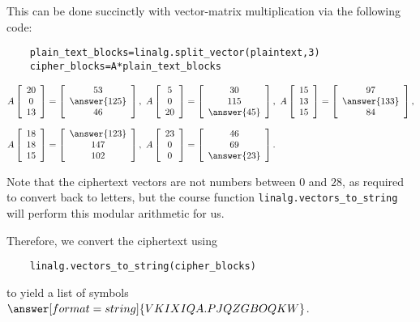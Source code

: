 \documentclass{ximera}
\begin{document}
\begin{example}
\begin{solution}
  This can be done succinctly with vector-matrix multiplication via the following code:

  \begin{verbatim}
    plain_text_blocks=linalg.split_vector(plaintext,3)
    cipher_blocks=A*plain_text_blocks
  \end{verbatim}


  \begin{align*}
    &A \startmat{c} 20 \\ 0 \\ 13 \stopmat
    = \startmat{c} 53\\\answer{125}\\46 \stopmat,
    \quad
    A \startmat{c} 5 \\ 0 \\ 20 \stopmat
    = \startmat{c} 30\\115\\\answer{45} \stopmat,
    \quad
    A \startmat{c} 15 \\ 13 \\ 15 \stopmat
    = \startmat{c} 97\\\answer{133}\\84 \stopmat,
    \\\\[-2ex]
    &A \startmat{c} 18 \\ 18 \\ 15 \stopmat
    = \startmat{c} \answer{123}\\147\\102 \stopmat,
    \quad
    A \startmat{c} 23 \\ 0 \\ 0 \stopmat
    = \startmat{c} 46\\69\\\answer{23} \stopmat.
  \end{align*}

  Note that the ciphertext vectors are not numbers between $0$ and $28$, as required to convert back to letters, but the course function \texttt{linalg.vectors\_to\_string} will perform this modular arithmetic for us.
  
  Therefore, we convert the ciphertext using 

  \begin{verbatim}
    linalg.vectors_to_string(cipher_blocks)
  \end{verbatim}
  
  to yield a list of symbols
  $\answer[format=string]{VKIXIQA.PJQZGBOQKW}$.
\end{solution}
\end{example}
\end{document}
